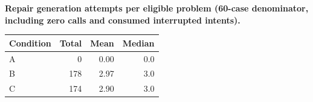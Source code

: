 \begin{center}
\textbf{Repair generation attempts per eligible problem (60-case denominator, including zero calls and consumed interrupted intents).}\par\vspace{3pt}
\small
\begin{tabular}{lrrr}
\toprule
Condition & Total & Mean & Median \\
\midrule
A & 0 & 0.00 & 0.0 \\
B & 178 & 2.97 & 3.0 \\
C & 174 & 2.90 & 3.0 \\
\bottomrule
\end{tabular}
\end{center}
